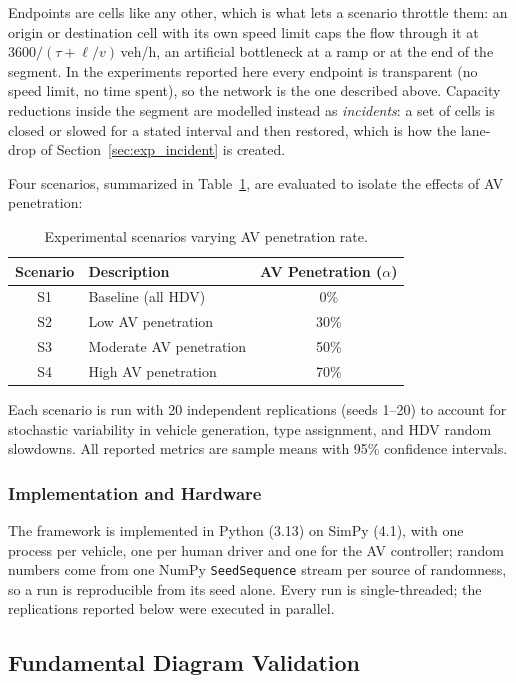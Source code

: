 \documentclass[review,number]{elsarticle}
\begin{document}
Endpoints are cells like any other, which is what lets a scenario throttle them: an origin or destination cell with its own speed limit caps the flow through it at $3600 / (\tau + \ell/v)$\,veh/h, an artificial bottleneck at a ramp or at the end of the segment. In the experiments reported here every endpoint is transparent (no speed limit, no time spent), so the network is the one described above. Capacity reductions inside the segment are modelled instead as \emph{incidents}: a set of cells is closed or slowed for a stated interval and then restored, which is how the lane-drop of Section~\ref{sec:exp_incident} is created.

Four scenarios, summarized in Table~\ref{tab:scenarios}, are evaluated to isolate the effects of AV penetration:

\begin{table}[ht]
\centering
\caption{Experimental scenarios varying AV penetration rate.}
\label{tab:scenarios}
\begin{tabular}{@{}clc@{}}
\toprule
Scenario & Description & AV Penetration ($\alpha$) \\
\midrule
S1 & Baseline (all HDV) & 0\% \\
S2 & Low AV penetration & 30\% \\
S3 & Moderate AV penetration & 50\% \\
S4 & High AV penetration & 70\% \\
\bottomrule
\end{tabular}
\end{table}

Each scenario is run with 20 independent replications (seeds 1--20) to account for stochastic variability in vehicle generation, type assignment, and HDV random slowdowns. All reported metrics are sample means with 95\% confidence intervals.

\subsubsection{Implementation and Hardware}

The framework is implemented in Python (3.13) on SimPy (4.1), with one process per vehicle, one per human driver and one for the AV controller; random numbers come from one NumPy \texttt{SeedSequence} stream per source of randomness, so a run is reproducible from its seed alone. Every run is single-threaded; the replications reported below were executed in parallel.


\subsection{Fundamental Diagram Validation}
\label{sec:exp_fd}
\end{document}
